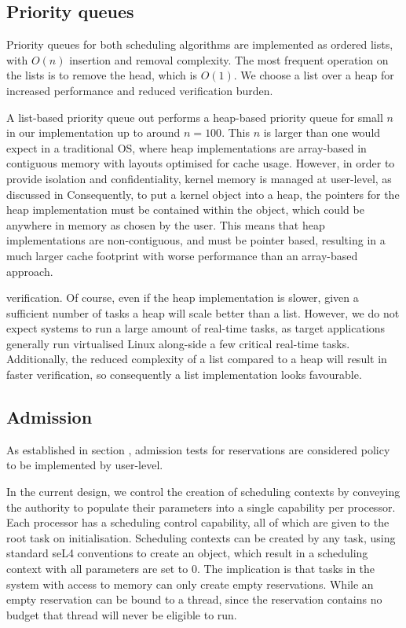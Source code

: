 \subsection{Priority queues}

Priority queues for both scheduling algorithms are implemented as ordered lists, with $O(n)$ insertion and removal complexity.
The most frequent operation on the lists is to remove the head, which is $O(1)$.
We choose a list over a heap for increased performance and reduced verification burden.

A list-based priority queue out performs a heap-based priority queue for small $n$ in our implementation up to around $n = 100$.
This $n$ is larger than one would expect in a traditional \gls{OS}, where heap implementations are array-based in contiguous memory with layouts optimised for cache usage.
However, in order to provide isolation and confidentiality, \selfour kernel memory is managed at user-level, as discussed in %
Consequently, to put a \selfour kernel object into a heap, the pointers for the heap implementation must be contained within the object, which could be anywhere in memory as chosen by the user.
This means that \selfour heap implementations are non-contiguous, and must be pointer based, resulting in a much larger cache footprint with worse performance than an array-based approach.

verification.
Of course, even if the heap implementation is slower, given a sufficient number of tasks a heap will scale better than a list.
However, we do not expect systems to run a large amount of real-time tasks, as \selfour target applications generally run virtualised Linux along-side a few critical real-time tasks.
Additionally, the reduced complexity of a list compared to a heap will result in faster verification, so consequently a list implementation looks favourable.

\subsection{Admission}

As established in section , admission tests for reservations are considered policy to be implemented by user-level.

In the current design, we control the creation of scheduling contexts by conveying the authority to populate their parameters into a single capability per processor.
Each processor has a scheduling control capability, all of which are given to the root task on initialisation.
Scheduling contexts can be created by any task, using standard seL4 conventions to create an object, which result in a scheduling context with all parameters are set to 0.
The implication is that tasks in the system with access to memory can only create empty reservations.
While an empty reservation can be bound to a thread, since the reservation contains no budget that thread will never be eligible to run.

